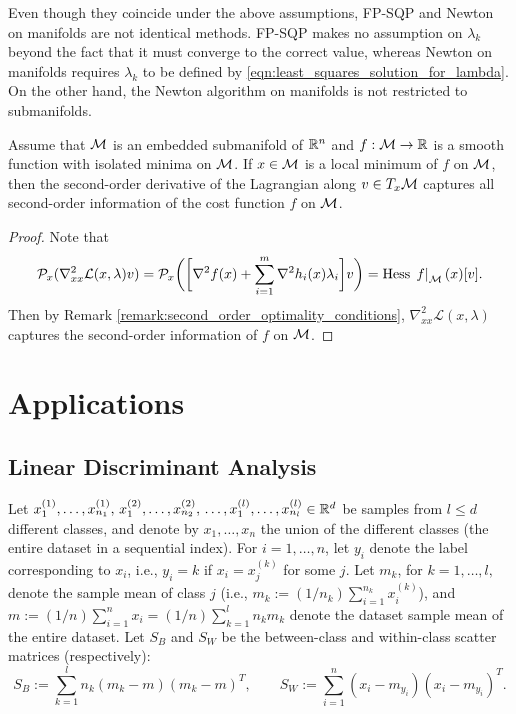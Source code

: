\documentclass[11pt,a4paper]{article}
\begin{document}
\begin{remark}
Even though they coincide under the above assumptions, FP-SQP and Newton
on manifolds are not identical methods. FP-SQP makes no assumption on $\lambda_k$ beyond the fact that it must converge to the correct value, whereas Newton on manifolds requires $\lambda_k$ to be defined by \eqref{eqn:least_squares_solution_for_lambda}. On the other hand, the Newton algorithm on manifolds is not restricted to submanifolds.
\end{remark}

\begin{prop}
Assume that $\mathcal{M}$ is an embedded submanifold of $\mathbb{R}^n$ and $f:\mathcal{M}\rightarrow \mathbb{R}$ is a smooth function with isolated minima on $\mathcal{M}$. If $x\in \mathcal{M}$ is a local minimum of $f$ on $\mathcal{M}$, then the second-order derivative of the Lagrangian along $v \in T_{x}\mathcal{M}$ captures all second-order information of the cost function $f$ on $\mathcal{M}$.
\end{prop}

\begin{proof}
Note that 
\begin{equation*}
\mathcal{P}_x(\nabla^2_{xx}\mathcal{L}(x,\lambda)v) =  \mathcal{P}_x\bigg(\bigg[\nabla^2 f(x)+\sum_{i=1}^m\nabla^2 h_i(x)\lambda_i\bigg]v\bigg) = \text{Hess}\,\left.f\right|_{\mathcal{M}}(x)[v].
\end{equation*}
Then by Remark \ref{remark:second_order_optimality_conditions}, $\nabla^2_{xx}\mathcal{L}(x,\lambda)$ captures the second-order information of $f$ on $\mathcal{M}$.
\end{proof}

\section{Applications}

\subsection{Linear Discriminant Analysis}

Let $x^{(1)}_1,\ldots,x^{(1)}_{n_1},\,x^{(2)}_1,\ldots,x^{(2)}_{n_2},\,\ldots,x^{(l)}_1,\ldots,x^{(l)}_{n_l}\in \mathbb{R}^d$ be samples from $l\le d$ different classes, and denote by $x_1,\ldots,x_n$ the union of the different classes (the entire dataset in a sequential index). For $i = 1,\ldots,n$, let $y_i$ denote the label corresponding to $x_i$, i.e., $y_i = k$ if $x_i = x^{(k)}_j$ for some $j$. Let $m_k$, for $k = 1,\ldots,l,$ denote the sample mean of class $j$ (i.e., $m_k := (1/n_k)\sum_{i=1}^{n_k}x_i^{(k)}$), and $m:=(1/n)\sum_{i=1}^nx_i = (1/n)\sum_{k = 1}^ln_km_k$ denote the dataset sample mean of the entire dataset. Let $S_B$ and $S_W$ be the between-class and within-class scatter matrices (respectively):
\begin{equation*}
S_B:= \sum_{k=1}^l n_k(m_k-m)(m_k-m)^T,\qquad S_W:= \sum_{i=1}^n (x_i-m_{y_i})(x_i-m_{y_i})^T.
\end{equation*}
\end{document}
